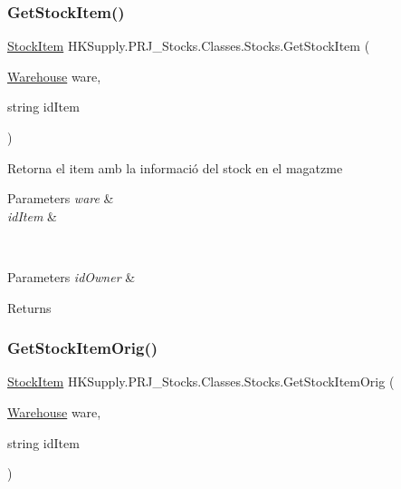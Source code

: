 \subsubsection{\texorpdfstring{Get\+Stock\+Item()}{GetStockItem()}}
{\footnotesize\ttfamily \mbox{\hyperlink{class_h_k_supply_1_1_p_r_j___stocks_1_1_classes_1_1_stocks_1_1_stock_item}{Stock\+Item}} H\+K\+Supply.\+P\+R\+J\+\_\+\+Stocks.\+Classes.\+Stocks.\+Get\+Stock\+Item (\begin{DoxyParamCaption}\item[{\mbox{\hyperlink{class_h_k_supply_1_1_p_r_j___stocks_1_1_classes_1_1_stocks_1_1_warehouse}{Warehouse}}}]{ware,  }\item[{string}]{id\+Item }\end{DoxyParamCaption})}



Retorna el item amb la informació del stock en el magatzme 


\begin{DoxyParams}{Parameters}
{\em ware} & \\
\hline
{\em id\+Item} & \\
\hline
\end{DoxyParams}
~\newline

\begin{DoxyParams}{Parameters}
{\em id\+Owner} & \\
\hline
\end{DoxyParams}
\begin{DoxyReturn}{Returns}

\end{DoxyReturn}
\mbox{\label{class_h_k_supply_1_1_p_r_j___stocks_1_1_classes_1_1_stocks_a9f91bf0312629b1ea7fc09f56a5e442c}} 
\subsubsection{\texorpdfstring{Get\+Stock\+Item\+Orig()}{GetStockItemOrig()}}
{\footnotesize\ttfamily \mbox{\hyperlink{class_h_k_supply_1_1_p_r_j___stocks_1_1_classes_1_1_stocks_1_1_stock_item}{Stock\+Item}} H\+K\+Supply.\+P\+R\+J\+\_\+\+Stocks.\+Classes.\+Stocks.\+Get\+Stock\+Item\+Orig (\begin{DoxyParamCaption}\item[{\mbox{\hyperlink{class_h_k_supply_1_1_p_r_j___stocks_1_1_classes_1_1_stocks_1_1_warehouse}{Warehouse}}}]{ware,  }\item[{string}]{id\+Item }\end{DoxyParamCaption})}



